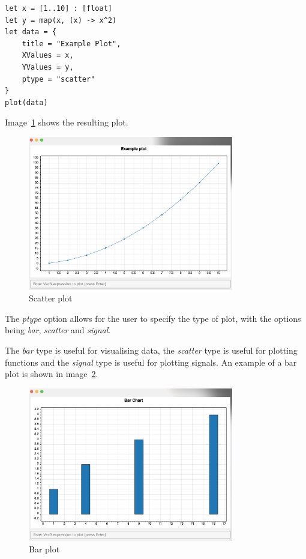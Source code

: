 \begin{verbatim}
let x = [1..10] : [float]
let y = map(x, (x) -> x^2)
let data = {
    title = "Example Plot",
    XValues = x,
    YValues = y,
    ptype = "scatter"
}
plot(data)
\end{verbatim}

Image~\ref{fig:scatter-plot} shows the resulting plot.

\begin{figure}[H]
    \centering
    \includegraphics[width=0.8\textwidth]{scatterPlot}
    \caption{Scatter plot}\label{fig:scatter-plot}
\end{figure}

The \textit{ptype} option allows for the user to specify the type of plot, with the options being \textit{bar},
\textit{scatter} and \textit{signal}.

The \textit{bar} type is useful for visualising data, the \textit{scatter} type is useful for plotting functions and
the \textit{signal} type is useful for plotting signals.
An example of a bar plot is shown in image~\ref{fig:bar-plot}.

\begin{figure}[H]
    \centering
    \includegraphics[width=0.8\textwidth]{barChart}
    \caption{Bar plot}\label{fig:bar-plot}
\end{figure}

